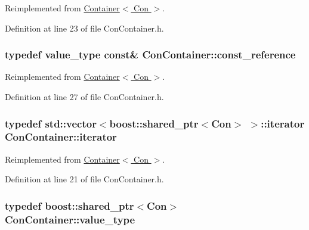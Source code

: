Reimplemented from \hyperlink{class_container_a5eabadaffdd508cb623c955eb0af1518}{Container$<$ Con $>$}.



Definition at line 23 of file ConContainer.h.

\hypertarget{class_con_container_ac644eca2f5ee432a6070fd1d397b3741}{
\subsubsection[{const\_\-reference}]{\setlength{\rightskip}{0pt plus 5cm}typedef {\bf value\_\-type} const\& {\bf ConContainer::const\_\-reference}}}
\label{class_con_container_ac644eca2f5ee432a6070fd1d397b3741}


Reimplemented from \hyperlink{class_container_a8dd7ae9d0687e11d873f98206e961ac1}{Container$<$ Con $>$}.



Definition at line 27 of file ConContainer.h.

\hypertarget{class_con_container_a5dc8aab66a22fc25b7e700b51265b577}{
\subsubsection[{iterator}]{\setlength{\rightskip}{0pt plus 5cm}typedef std::vector$<$boost::shared\_\-ptr$<${\bf Con}$>$ $>$::{\bf iterator} {\bf ConContainer::iterator}}}
\label{class_con_container_a5dc8aab66a22fc25b7e700b51265b577}


Reimplemented from \hyperlink{class_container_afe880028d8304353129f47cd1d28c20a}{Container$<$ Con $>$}.



Definition at line 21 of file ConContainer.h.

\hypertarget{class_con_container_a08881a149e3a285eba67a4c8cff92a9e}{
\subsubsection[{value\_\-type}]{\setlength{\rightskip}{0pt plus 5cm}typedef boost::shared\_\-ptr$<${\bf Con}$>$ {\bf ConContainer::value\_\-type}}}
\label{class_con_container_a08881a149e3a285eba67a4c8cff92a9e}


